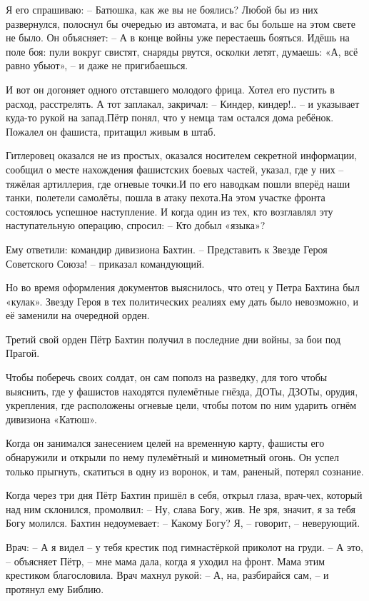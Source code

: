 Я его спрашиваю:
– Батюшка, как же вы не боялись? Любой бы из них развернулся, полоснул бы очередью из автомата, и вас бы больше на этом свете не было.
Он объясняет:
– А в конце войны уже перестаешь бояться. Идёшь на поле боя: пули вокруг свистят, снаряды рвутся, осколки летят, думаешь: «А, всё равно убьют», – и даже не пригибаешься.

И вот он догоняет одного отставшего молодого фрица. Хотел его пустить в расход, расстрелять. А тот заплакал, закричал:
– Киндер, киндер!.. – и указывает куда-то рукой на запад.Пётр понял, что у немца там остался дома ребёнок. Пожалел он фашиста, притащил живым в штаб.

Гитлеровец оказался не из простых, оказался носителем секретной информации, сообщил о месте нахождения фашистских боевых частей, указал, где у них – тяжёлая артиллерия, где огневые точки.И по его наводкам пошли вперёд наши танки, полетели самолёты, пошла в атаку пехота.На этом участке фронта состоялось успешное наступление.
И когда один из тех, кто возглавлял эту наступательную операцию, спросил:
– Кто добыл «языка»?

Ему ответили: командир дивизиона Бахтин.
– Представить к Звезде Героя Советского Союза! – приказал командующий.

Но во время оформления документов выяснилось, что отец у Петра Бахтина был «кулак». Звезду Героя в тех политических реалиях ему дать было невозможно, и её заменили на очередной орден.

Третий свой орден Пётр Бахтин получил в последние дни войны, за бои под Прагой.

Чтобы поберечь своих солдат, он сам пополз на разведку, для того чтобы выяснить, где у фашистов находятся пулемётные гнёзда, ДОТы, ДЗОТы, орудия, укрепления, где расположены огневые цели, чтобы потом по ним ударить огнём дивизиона «Катюш».

Когда он занимался занесением целей на временную карту, фашисты его обнаружили и открыли по нему пулемётный и минометный огонь. Он успел только прыгнуть, скатиться в одну из воронок, и там, раненый, потерял сознание.

Когда через три дня Пётр Бахтин пришёл в себя, открыл глаза, врач-чех, который над ним склонился, промолвил:
– Ну, слава Богу, жив. Не зря, значит, я за тебя Богу молился.
Бахтин недоумевает:
– Какому Богу? Я, – говорит, – неверующий.

Врач:
– А я видел – у тебя крестик под гимнастёркой приколот на груди.
– А это, – объясняет Пётр, – мне мама дала, когда я уходил на фронт. Мама этим крестиком благословила.
Врач махнул рукой:
– А, на, разбирайся сам, – и протянул ему Библию.

